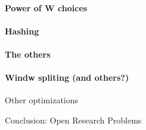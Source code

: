   \paragraph{Power of W choices}
  \paragraph{Hashing}
  \paragraph{The others}
  \paragraph{Windw spliting (and others?)}

  Other optimizations

  Conclusion: Open Research Problems \cite{Schneider_2013}











